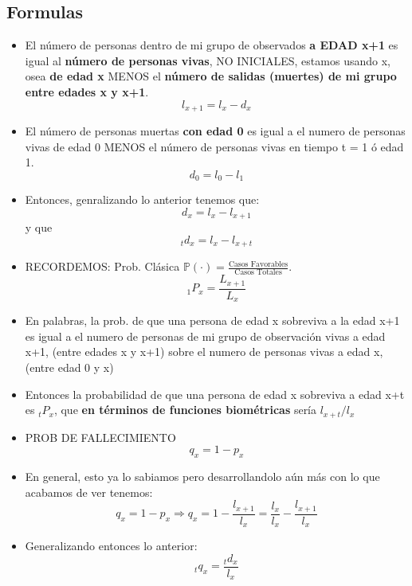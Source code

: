 \documentclass{article}
\begin{document}
\subsection*{Formulas}
\begin{itemize}
    \item El número de personas dentro de mi grupo de observados \textbf{a EDAD x+1} es igual al \textbf{número de personas vivas}, NO INICIALES, estamos usando x, osea \textbf{de edad x} MENOS el \textbf{número de salidas (muertes) de mi grupo entre edades x y x+1}. \[l_{x+1} = l_x - d_x\]
    
    \item El número de personas muertas \textbf{con edad 0} es igual a el numero de personas vivas de edad 0 MENOS el número de personas vivas en tiempo t = 1 ó edad 1. \[d_0 = l_0 - l_1\]

    \item Entonces, genralizando lo anterior tenemos que: \[d_x = l_x - l_{x+1}\] y que \[{}_td_x = l_x - l_{x+t}\]

    \item RECORDEMOS: Prob. Clásica \(\mathbb{P}(\cdot) = \frac{\text{Casos Favorables}}{\text{Casos Totales}}\). \[{}_1P_x = \frac{L_{x+1}}{L_x}\]
    \item En palabras, la prob. de que una persona de edad x sobreviva a la edad x+1 es igual a el numero de personas de mi grupo de observación vivas a edad x+1, (entre edades x y x+1) sobre el numero de personas vivas a edad x, (entre edad 0 y x)

    \item Entonces la probabilidad de que una persona de edad x sobreviva a edad x+t es \({}_tP_x\), que \textbf{en términos de funciones biométricas} sería \(l_{x+t}/l_x\)

    \item PROB DE FALLECIMIENTO \[q_x = 1-p_x\]
    \item En general, esto ya lo sabiamos pero desarrollandolo aún más con lo que acabamos de ver tenemos: \[q_x = 1- p_x  \Rightarrow q_x = 1 - \frac{l_{x+1}}{l_x} = \frac{l_x}{l_x} - \frac{l_{x+1}}{l_x}\]

    \item Generalizando entonces lo anterior: \[{}_tq_x = \frac{{}_td_x}{l_x}\]
\end{itemize}
\end{document}

